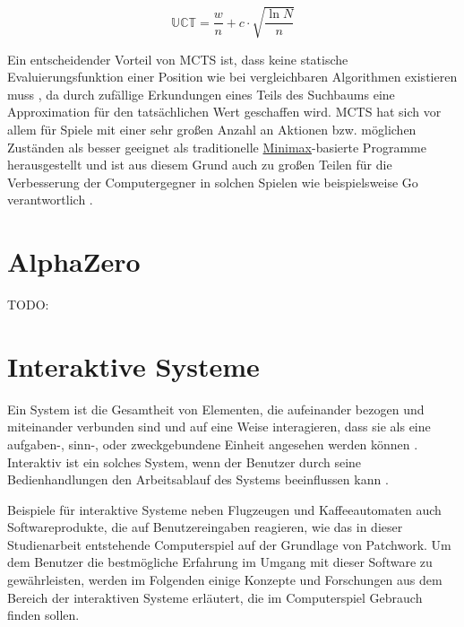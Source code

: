 \begin{equation}
    \label{eqn:uct}
    \mathbb{U}\mathbb{C}\mathbb{T} = \frac{w}{n} + c \cdot \sqrt{\frac{\ln N}{n}}
\end{equation}

Ein entscheidender Vorteil von \ac{MCTS} ist, dass keine statische Evaluierungsfunktion einer Position wie bei vergleichbaren Algorithmen existieren muss \cite[S. 61]{2008.ParallelMCTS}, da durch zufällige Erkundungen eines Teils des Suchbaums eine Approximation für den tatsächlichen Wert geschaffen wird. \ac{MCTS} hat sich vor allem für Spiele mit einer sehr großen Anzahl an Aktionen bzw. möglichen Zuständen als besser geeignet als traditionelle \hyperref[chapter:minimax-algorithmus]{Minimax}-basierte Programme herausgestellt \cite[S. 1]{2013.MCTSAndMinimaxHybrids} und ist aus diesem Grund auch zu großen Teilen für die Verbesserung der Computergegner in solchen Spielen wie beispielsweise Go verantwortlich \cite[S. 206]{2009.ComputerGoMCTS} \cite[S. 185]{2018.ReinforcementLearning}.

\section{AlphaZero}
\label{chapter:alphazero}

TODO:

\section{Interaktive Systeme}
\label{chapter:interaktive-systeme}

Ein System ist die Gesamtheit von Elementen, die aufeinander bezogen und miteinander verbunden sind und auf eine Weise interagieren, dass sie als eine aufgaben-, sinn-, oder zweckgebundene Einheit angesehen werden können \cite{2014.Systeme}. Interaktiv ist ein solches System, wenn der Benutzer durch seine Bedienhandlungen den Arbeitsablauf des Systems beeinflussen kann \cite[S. 3]{2011.Heinecke}.

Beispiele für interaktive Systeme neben Flugzeugen und Kaffeeautomaten auch Softwareprodukte, die auf Benutzereingaben reagieren, wie das in dieser Studienarbeit entstehende Computerspiel auf der Grundlage von Patchwork. Um dem Benutzer die bestmögliche Erfahrung im Umgang mit dieser Software zu gewährleisten, werden im Folgenden einige Konzepte und Forschungen aus dem Bereich der interaktiven Systeme erläutert, die im Computerspiel Gebrauch finden sollen.

